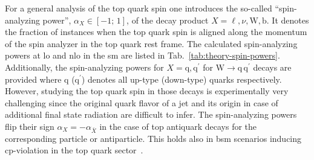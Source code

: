 For a general analysis of the top quark spin one introduces the so-called ``spin-analyzing power'', $\alpha_{X}\in[-1;\,1]$, of the decay product $X=\ell,\nu,\mathrm{W},\mathrm{b}$. It denotes the fraction of instances when the top quark spin is aligned along the momentum of the spin analyzer in the top quark rest frame. The calculated spin-analyzing powers at \gls{lo} and \gls{nlo} in the \gls{sm} are listed in Tab.~\ref{tab:theory-spin-powers}. Additionally, the spin-analyzing powers for $X=\mathrm{q},\mathrm{q}^\prime$ for $\mathrm{W}\to \mathrm{q}\,\mathrm{q}^\prime$ decays are provided where $\mathrm{q}$ ($\mathrm{q}^\prime$) denotes all up-type (down-type) quarks respectively. However, studying the top quark spin in those decays is experimentally very challenging since the original quark flavor of a jet and its origin in case of additional final state radiation are difficult to infer. The spin-analyzing powers flip their sign $\alpha_{X}=-\alpha_{\bar{X}}$ in the case of top antiquark decays for the corresponding particle or antiparticle. This holds also in \gls{bsm} scenarios inducing \gls{cp}-violation in the top quark sector~\cite{AguilarSaavedra:2010nx}.


